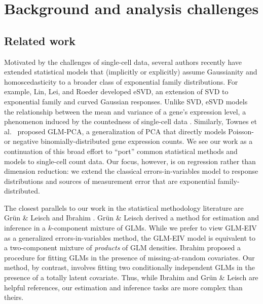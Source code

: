 \documentclass[12pt]{article}
\begin{document}
\section{Background and analysis challenges}

\subsection{Related work}

Motivated by the challenges of single-cell data, several authors recently have extended statistical models that (implicitly or explicitly) assume Gaussianity and homoscedasticity to a broader class of exponential family distributions. For example, Lin, Lei, and Roeder \cite{Lin2021} developed eSVD, an extension of SVD to exponential family and curved Gaussian responses. Unlike SVD, eSVD models the relationship between the mean and variance of a gene's expression level, a phenomenon induced by the countedness of single-cell data \cite{Lause2021}.
Similarly, Townes et al.\ \cite{Townes2019} proposed GLM-PCA, a generalization of PCA that directly models Poisson- or negative binomially-distributed gene expression counts. We see our work as a continuation of this broad effort to ``port'' common statistical methods and models to single-cell count data. Our focus, however, is on regression rather than dimension reduction: we extend the classical errors-in-variables model to response distributions and sources of measurement error that are exponential family-distributed.

The closest parallels to our work in the statistical methodology literature are Gr\"{u}n \& Leisch \cite{Grun2008} and Ibrahim \cite{Ibrahim1990}. Gr\"{u}n \& Leisch derived a method for estimation and inference in a $k$-component mixture of GLMs. While we prefer to view GLM-EIV as a generalized errors-in-variables method,  the GLM-EIV model is equivalent to a two-component mixture of \textit{products} of GLM densities. Ibrahim proposed a procedure for fitting GLMs in the presence of missing-at-random covariates. Our method, by contrast, involves fitting two conditionally independent GLMs in the presence of a totally latent covariate. Thus, while Ibrahim and Gr\"{u}n \& Leisch are helpful references, our estimation and inference tasks are more complex than theirs.
\end{document}
